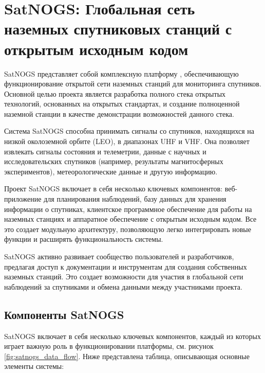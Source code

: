 \chapter{SatNOGS: Глобальная сеть наземных спутниковых станций с открытым исходным кодом}

SatNOGS представляет собой комплексную платформу \cite{satnogs_general_docs},
обеспечивающую функционирование открытой сети наземных станций для мониторинга
спутников. Основной целью проекта является разработка полного стека открытых
технологий, основанных на открытых стандартах, и создание полноценной наземной
станции в качестве демонстрации возможностей данного стека.

Система SatNOGS способна принимать сигналы со спутников, находящихся на низкой
околоземной орбите (LEO), в диапазонах UHF и VHF. Она позволяет извлекать
сигналы состояния и телеметрии, данные с научных и исследовательских спутников
(например, результаты магнитосферных экспериментов), метеорологические данные и
другую информацию.

Проект SatNOGS включает в себя несколько ключевых компонентов: веб-приложение
для планирования наблюдений, базу данных для хранения информации о спутниках,
клиентское программное обеспечение для работы на наземных станциях и аппаратное
обеспечение с открытым исходным кодом. Все это создает модульную архитектуру,
позволяющую легко интегрировать новые функции и расширять функциональность
системы.

SatNOGS активно развивает сообщество пользователей и разработчиков, предлагая
доступ к документации и инструментам для создания собственных наземных станций.
Это создает возможности для участия в глобальной сети наблюдений за спутниками
и обмена данными между участниками проекта.

\section{Компоненты SatNOGS}

SatNOGS включает в себя несколько ключевых компонентов, каждый из которых играет
важную роль в функционировании платформы, см. рисунок
\ref{fig:satnogs_data_flow}.
Ниже представлена таблица, описывающая основные элементы системы:

